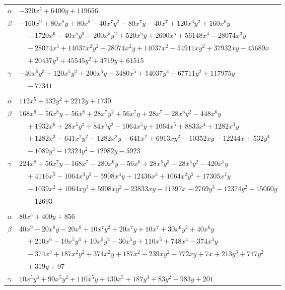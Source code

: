 \documentclass[11pt]{article}
\begin{document}
\begin{longtable}{@{}ll@{}}
$\alpha$ & $-320x^{5}+6400y+119656$\\
$\beta$ & $-160x^{9}+80x^{8}y+80x^{8}-40x^{7}y^{2}-80x^{7}y-40x^{7}+120x^{6}y^{2}+160x^{6}y$\\
 & $\quad -1720x^{6}-40x^{5}y^{3}-200x^{5}y^{2}+520x^{5}y+2600x^{5}+56148x^{4}-28074x^{3}y$\\
 & $\quad -28074x^{3}+14037x^{2}y^{2}+28074x^{2}y+14037x^{2}-54911xy^{2}+37932xy-45689x$\\
 & $\quad +20437y^{3}+45545y^{2}+4719y+61515$\\
$\gamma$ & $-40x^{5}y^{3}+120x^{5}y^{2}+200x^{5}y-3480x^{5}+14037y^{3}-67711y^{2}+117975y$\\
 & $\quad -77341$\\
\addlinespace[3pt]
\multicolumn{2}{@{}l}{$\{i,j\}=\{12,30\}$, $k_{ij}=2\cdot 3\cdot 5^{2}$}\\
$\alpha$ & $112x^{5}+532y^{2}+2212y+1730$\\
$\beta$ & $168x^{9}-56x^{8}y-56x^{8}+28x^{7}y^{2}+56x^{7}y+28x^{7}-28x^{6}y^{2}-448x^{6}y$\\
 & $\quad +1932x^{6}+28x^{5}y^{3}+84x^{5}y^{2}-1064x^{5}y+1064x^{5}+8833x^{4}+1282x^{3}y$\\
 & $\quad +1282x^{3}-641x^{2}y^{2}-1282x^{2}y-641x^{2}+6913xy^{2}-10352xy-12244x+532y^{4}$\\
 & $\quad -1089y^{3}-12324y^{2}-12982y-5923$\\
$\gamma$ & $224x^{8}+56x^{7}y-168x^{7}-280x^{6}y-56x^{6}+28x^{5}y^{3}-28x^{5}y^{2}-420x^{5}y$\\
 & $\quad +4116x^{5}-1064x^{3}y^{2}-5908x^{3}y+12436x^{3}+1064x^{2}y^{2}+17305x^{2}y$\\
 & $\quad -1039x^{2}+1064xy^{3}+5908xy^{2}-23833xy-11397x-2769y^{3}-12374y^{2}-15060y$\\
 & $\quad -12693$\\
\addlinespace[3pt]
\multicolumn{2}{@{}l}{$\{i,j\}=\{12,34\}$, $k_{ij}=2^{3}\cdot 3^{2}\cdot 7^{2}$}\\
$\alpha$ & $80x^{5}+400y+856$\\
$\beta$ & $40x^{9}-20x^{8}y-20x^{8}+10x^{7}y^{2}+20x^{7}y+10x^{7}+30x^{6}y^{2}+40x^{6}y$\\
 & $\quad +210x^{6}-10x^{5}y^{3}+10x^{5}y^{2}-30x^{5}y+110x^{5}+748x^{4}-374x^{3}y$\\
 & $\quad -374x^{3}+187x^{2}y^{2}+374x^{2}y+187x^{2}-239xy^{2}-772xy+7x+213y^{3}+747y^{2}$\\
 & $\quad +319y+97$\\
$\gamma$ & $10x^{5}y^{3}+90x^{5}y^{2}+110x^{5}y+430x^{5}+187y^{3}+83y^{2}-983y+201$\\

\end{longtable}
\end{document}
